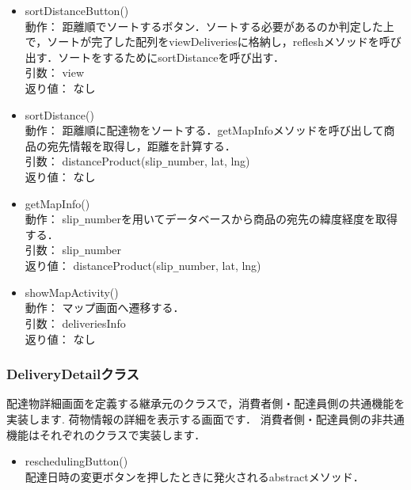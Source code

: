 \documentclass[a4j,titlepage]{jarticle}
\begin{document}
\begin{itemize}
  \item sortDistanceButton()\\
  動作：  距離順でソートするボタン．ソートする必要があるのか判定した上で，ソートが完了した配列をviewDeliveriesに格納し，refleshメソッドを呼び出す．ソートをするためにsortDistanceを呼び出す．\\
  引数：   view\\
  返り値：  なし

  \item sortDistance()\\
  動作：  距離順に配達物をソートする．getMapInfoメソッドを呼び出して商品の宛先情報を取得し，距離を計算する．\\
  引数：  distanceProduct(slip\verb|_|number, lat, lng)\\
  返り値：  なし

  \item getMapInfo()\\
  動作：  slip\verb|_|numberを用いてデータベースから商品の宛先の緯度経度を取得する．\\
  引数：  slip\verb|_|number\\
  返り値：  distanceProduct(slip\verb|_|number, lat, lng)

  \item showMapActivity()\\
  動作：  マップ画面へ遷移する．\\
  引数：  deliveriesInfo\\
  返り値：  なし
\end{itemize}

\subsubsection{DeliveryDetailクラス}
配達物詳細画面を定義する継承元のクラスで，消費者側・配達員側の共通機能を実装します.
荷物情報の詳細を表示する画面です．
 消費者側・配達員側の非共通機能はそれぞれのクラスで実装します．
 
\begin{itemize}
 \item reschedulingButton()\\
 配達日時の変更ボタンを押したときに発火されるabstractメソッド．\\
\end{itemize}
\end{document}
